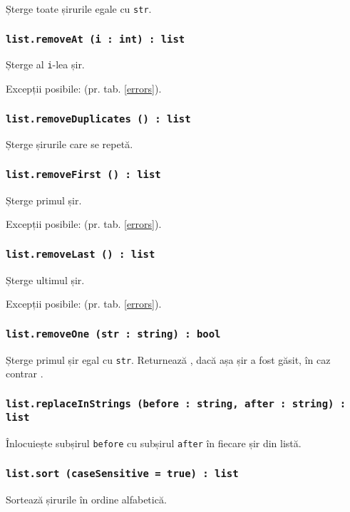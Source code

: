 Șterge toate șirurile egale cu \texttt{str}.

\subsubsection{\texttt{list.removeAt (i : int) : list}}

Șterge al \texttt{i}-lea șir.

Excepții posibile:  (pr. tab. \ref{errors}).

\subsubsection{\texttt{list.removeDuplicates () : list}}

Șterge șirurile care se repetă.

\subsubsection{\texttt{list.removeFirst () : list}}

Șterge primul șir.

Excepții posibile:  (pr. tab. \ref{errors}).

\subsubsection{\texttt{list.removeLast () : list}}

Șterge ultimul șir.

Excepții posibile:  (pr. tab. \ref{errors}).

\subsubsection{\texttt{list.removeOne (str : string) : bool}}

Șterge primul șir egal cu \texttt{str}. Returnează \true, dacă așa șir a fost găsit, în caz contrar \false.

\subsubsection{\texttt{list.replaceInStrings (before : string, after : string) : list}}

Înlocuiește subșirul \texttt{before} cu subșirul \texttt{after} în fiecare șir din listă.

\subsubsection{\texttt{list.sort (caseSensitive = true) : list}}

Sortează șirurile în ordine alfabetică.

